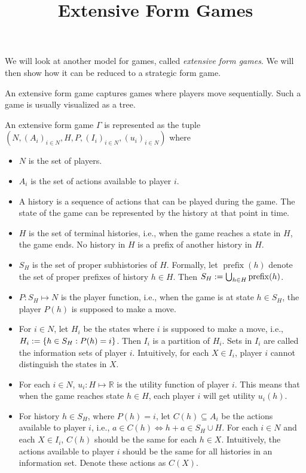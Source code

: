 

\title{Extensive Form Games}



\maketitle
\initMinimal{}

We will look at another model for games, called \emph{extensive form games}.
We will then show how it can be reduced to a strategic form game.

An extensive form game captures games where players move sequentially.
Such a game is usually visualized as a tree.

An extensive form game $\Gamma$ is represented as the tuple
$(N, (A_i)_{i \in N}, H, P, (I_i)_{i \in N}, (u_i)_{i \in N})$ where
\begin{itemize}
\item $N$ is the set of players.
\item $A_i$ is the set of actions available to player $i$.
\item A history is a sequence of actions that can be played during the game.
    The state of the game can be represented by the history at that point in time.
\item $H$ is the set of terminal histories, i.e.,
    when the game reaches a state in $H$, the game ends.
    No history in $H$ is a prefix of another history in $H$.
\item $S_H$ is the set of proper subhistories of $H$. Formally, let
    $\operatorname{prefix}(h)$ denote the set of proper prefixes of history $h \in H$.
    Then $S_H := \bigcup_{h \in H} \operatorname{prefix}(h)$.
\item $P: S_H \mapsto N$ is the player function, i.e., when the game is at state $h \in S_H$,
    the player $P(h)$ is supposed to make a move.
\item For $i \in N$, let $H_i$ be the states where $i$ is supposed to make a move,
    i.e., $H_i := \{h \in S_H: P(h) = i\}$. Then $I_i$ is a partition of $H_i$.
    Sets in $I_i$ are called the information sets of player $i$.
    Intuitively, for each $X \in I_i$, player $i$ cannot distinguish the states in $X$.
\item For each $i \in N$, $u_i: H \mapsto \mathbb{R}$ is the utility function of player $i$.
    This means that when the game reaches state $h \in H$,
    each player $i$ will get utility $u_i(h)$.
\item For history $h \in S_H$, where $P(h) = i$, let $C(h) \subseteq A_i$ be the
    actions available to player $i$, i.e., $a \in C(h) \iff h + a \in S_H \cup H$.
    For each $i \in N$ and each $X \in I_i$, $C(h)$ should be the same for each $h \in X$.
    Intuitively, the actions available to player $i$ should be the same
    for all histories in an information set. Denote these actions as $C(X)$.
\end{itemize}

